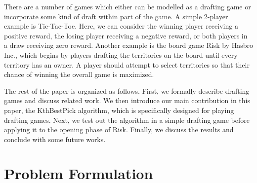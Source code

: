 \documentclass[letterpaper]{article}
\numberwithin{equation}{section}
\numberwithin{theorem}{section}
\numberwithin{lemma}{section}
\numberwithin{df}{section}
\begin{document}
There are a number of games which either can be modelled as a drafting game or incorporate some kind of draft within part of the game.  A simple 2-player example is Tic-Tac-Toe.  Here, we can consider the winning player receiving a positive reward, the losing player receiving a negative reward, or both players in a draw receiving zero reward. Another example is the board game Risk by Hasbro Inc., which begins by players drafting the territories on the board until every territory has an owner.  A player should attempt to select territories so that their chance of winning the overall game is maximized.

The rest of the paper is organized as follows.  First, we formally describe drafting games and discuss related work.  We then introduce our main contribution in this paper, the KthBestPick algorithm, which is specifically designed for playing drafting games.  Next, we test out the algorithm in a simple drafting game before applying it to the opening phase of Risk.  Finally, we discuss the results and conclude with some future works.

\section{Problem Formulation}
\label{sec:Prob}
\end{document}
